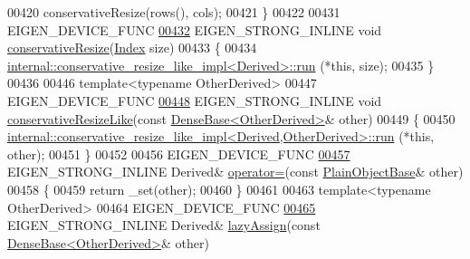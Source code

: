 \begin{DoxyCode}
00420       conservativeResize(rows(), cols);
00421     \}
00422 
00431     EIGEN\_DEVICE\_FUNC
\hyperlink{class_eigen_1_1_plain_object_base_a5429214e7c1ffaf7294a93a5cec62007}{00432}     EIGEN\_STRONG\_INLINE \textcolor{keywordtype}{void} \hyperlink{class_eigen_1_1_plain_object_base_a5429214e7c1ffaf7294a93a5cec62007}{conservativeResize}(\hyperlink{namespace_eigen_a62e77e0933482dafde8fe197d9a2cfde}{Index} size)
00433     \{
00434       \hyperlink{struct_eigen_1_1internal_1_1conservative__resize__like__impl}{internal::conservative\_resize\_like\_impl<Derived>::run}
      (*\textcolor{keyword}{this}, size);
00435     \}
00436 
00446     \textcolor{keyword}{template}<\textcolor{keyword}{typename} OtherDerived>
00447     EIGEN\_DEVICE\_FUNC
\hyperlink{class_eigen_1_1_plain_object_base_a7775d274035c4ef541aa0fc9a3ad30a2}{00448}     EIGEN\_STRONG\_INLINE \textcolor{keywordtype}{void} \hyperlink{class_eigen_1_1_plain_object_base_a7775d274035c4ef541aa0fc9a3ad30a2}{conservativeResizeLike}(\textcolor{keyword}{const} 
      \hyperlink{group___core___module_class_eigen_1_1_dense_base}{DenseBase<OtherDerived>}& other)
00449     \{
00450       \hyperlink{struct_eigen_1_1internal_1_1conservative__resize__like__impl}{internal::conservative\_resize\_like\_impl<Derived,OtherDerived>::run}
      (*\textcolor{keyword}{this}, other);
00451     \}
00452 
00456     EIGEN\_DEVICE\_FUNC
\hyperlink{class_eigen_1_1_plain_object_base_a75308f8a23a03f045a1260611e2054a0}{00457}     EIGEN\_STRONG\_INLINE Derived& \hyperlink{class_eigen_1_1_plain_object_base_a75308f8a23a03f045a1260611e2054a0}{operator=}(\textcolor{keyword}{const} \hyperlink{class_eigen_1_1_plain_object_base}{PlainObjectBase}& other)
00458     \{
00459       \textcolor{keywordflow}{return} \_set(other);
00460     \}
00461 
00463     \textcolor{keyword}{template}<\textcolor{keyword}{typename} OtherDerived>
00464     EIGEN\_DEVICE\_FUNC
\hyperlink{class_eigen_1_1_plain_object_base_a6008cee3b716d514b3e14c1bc7c0d34a}{00465}     EIGEN\_STRONG\_INLINE Derived& \hyperlink{class_eigen_1_1_plain_object_base_a6008cee3b716d514b3e14c1bc7c0d34a}{lazyAssign}(\textcolor{keyword}{const} 
      \hyperlink{group___core___module_class_eigen_1_1_dense_base}{DenseBase<OtherDerived>}& other)

\end{DoxyCode}
